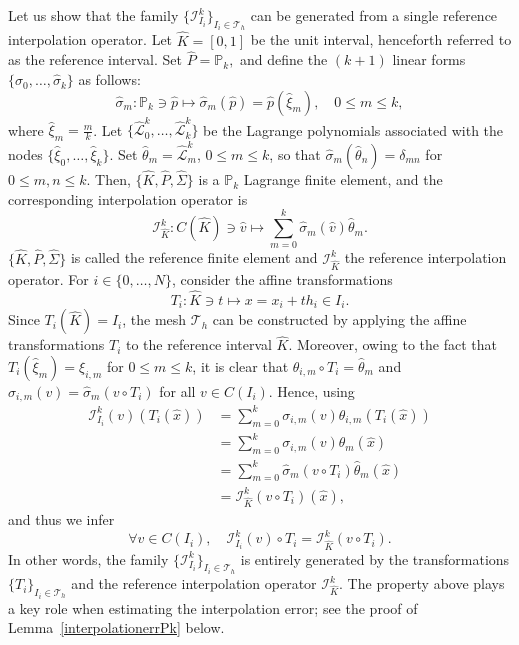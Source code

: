 Let us show that the family $\{\mathcal{I}_{I_i}^k\}_{I_i \in \mathcal{T}_h}$ can be generated from a single reference interpolation operator. Let $\hat{K} = [0, 1]$ be the unit interval, henceforth referred to as the reference interval. Set $\hat{P} = \mathbb{P}_k,$ and define the $(k+1)$ linear forms $\{\hat{\sigma}_0, \dots, \hat{\sigma}_k\}$ as follows:
\begin{equation*}
\hat{\sigma}_m: \mathbb{P}_k \ni \hat{p} \mapsto \hat{\sigma}_m(\hat{p}) = \hat{p}(\hat{\xi}_m), \quad 0 \le m \le k,
\end{equation*}
where $\hat{\xi}_m = \frac{m}{k}$. Let $\{\hat{\mathcal{L}}_0^k, \dots, \hat{\mathcal{L}}_k^k\}$ be the Lagrange polynomials associated with the nodes $\{\hat{\xi}_0, \dots, \hat{\xi}_k\}$. Set $\hat{\theta}_m = \hat{\mathcal{L}}_m^k$, $0 \le m \le k$, so that $\hat{\sigma}_m(\hat{\theta}_n) = \delta_{mn}$ for $0 \le m,n \le k$. Then, $\{\hat{K}, \hat{P}, \hat{\Sigma}\}$ is a $\mathbb{P}_k$ Lagrange finite element, and the corresponding interpolation operator is
\begin{equation*}
\mathcal{I}_{\hat{K}}^k: C(\hat{K}) \ni \hat{v} \mapsto \sum_{m=0}^k \hat{\sigma}_m(\hat{v}) \hat{\theta}_m.
\end{equation*}
$\{\hat{K}, \hat{P}, \hat{\Sigma}\}$ is called the reference finite element and $\mathcal{I}_{\hat{K}}^k$ the reference interpolation operator. For $i \in \{0, \dots, N\}$, consider the affine transformations
\begin{equation*}
T_i: \hat{K} \ni t \mapsto x = x_i + th_i \in I_i.
\end{equation*}
Since $T_i(\hat{K}) = I_i$, the mesh $\mathcal{T}_h$ can be constructed by applying the affine transformations $T_i$ to the reference interval $\hat{K}$. Moreover, owing to the fact that $T_i(\hat{\xi}_m) = \xi_{i,m}$ for $0 \le m \le k$, it is clear that $\theta_{i,m} \circ T_i = \hat{\theta}_m$ and $\sigma_{i,m}(v) = \hat{\sigma}_m(v \circ T_i)$ for all $v \in C(I_i)$. Hence, using
\begin{align*}
    \mathcal{I}_{I_i}^k(v)(T_i(\hat{x})) &= \sum_{m=0}^k \sigma_{i,m}(v) \theta_{i,m}(T_i(\hat{x})) \\
    &= \sum_{m=0}^k \sigma_{i,m}(v) \hat{\theta}_m(\hat{x}) \\
    &= \sum_{m=0}^k \hat{\sigma}_m(v \circ T_i) \hat{\theta}_m(\hat{x})\\
    & = \mathcal{I}_{\hat{K}}^k(v \circ T_i)(\hat{x}),
\end{align*}
and thus we infer
\begin{equation*}
\forall v \in C(I_i), \quad \mathcal{I}_{I_i}^k(v) \circ T_i = \mathcal{I}_{\hat{K}}^k(v \circ T_i).
\end{equation*}
In other words, the family $\{\mathcal{I}_{I_i}^k\}_{I_i \in \mathcal{T}_h}$ is entirely generated by the transformations $\{T_i\}_{I_i \in \mathcal{T}_h}$ and the reference interpolation operator $\mathcal{I}_{\hat{K}}^k$. The property above plays a key role when estimating the interpolation error; see the proof of Lemma~\ref{interpolationerrPk} below.

